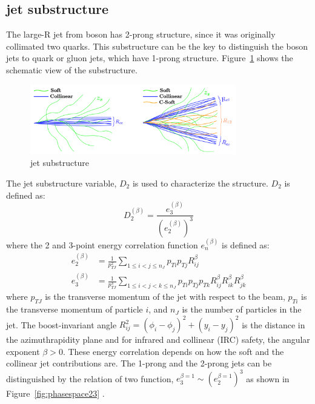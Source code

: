 \subsection{jet substructure}
The large-R jet from boson has 2-prong structure, since it was originally collimated two quarks. This substructure can be the key to distinguish the boson jets to quark or gluon jets, which have 1-prong structure.
Figure~\ref{fig:jetsub} shows the schematic view of the substructure.
 \begin{figure}[tbp]
    \begin{center}
    \includegraphics[width=0.80\textwidth,keepaspectratio]{figures/Reconstruction/jetsub}
    \caption{
    jet substructure \cite{Larkoski_2014}
    }
    \label{fig:jetsub}
    \end{center}
    \end{figure}
The jet substructure variable, $D_2$ is used to characterize the structure.  $D_2$ is defined as:
\begin{equation}
D_{2}^{(\beta)}=\frac{e_{3}^{(\beta)}}{\left(e_{2}^{(\beta)}\right)^{3}}
\end{equation}
where the 2 and 3-point energy correlation function $e_{n}^{(\beta)}$ is defined as:
\begin{equation}
\begin{aligned}
e_{2}^{(\beta)} &=\frac{1}{p_{T J}^{2}} \sum_{1 \leq i<j \leq n_{J}} p_{T i} p_{T j} R_{i j}^{\beta} \\
e_{3}^{(\beta)} &=\frac{1}{p_{T J}^{3}} \sum_{1 \leq i<j<k \leq n_{J}} p_{T i} p_{T j} p_{T k} R_{i j}^{\beta} R_{i k}^{\beta} R_{j k}^{\beta}
\end{aligned}
\end{equation}
where $p_{T J}$ is the transverse momentum of the jet with respect to the beam, $p_{T i}$ is the transverse momentum of particle $i$, and $n_{J}$ is the number of particles in the jet. 
The boost-invariant angle $R_{ij}^{2}=\left(\phi_{i}-\phi_{j}\right)^{2}+\left(y_{i}-y_{j}\right)^{2}$ is the distance in the azimuthrapidity plane and for infrared and collinear (IRC) safety, the angular exponent $\beta>0$. 
These energy correlation depends on how the soft and the collinear jet contributions are. The 1-prong and the 2-prong jets can be distinguished by the relation of two function, $e_{3}^{\beta=1} \sim\left(e_{2}^{\beta=1}\right)^{3}$ as shown in Figure~\ref{fig:phasespace23} \cite{Larkoski_2014}. 
